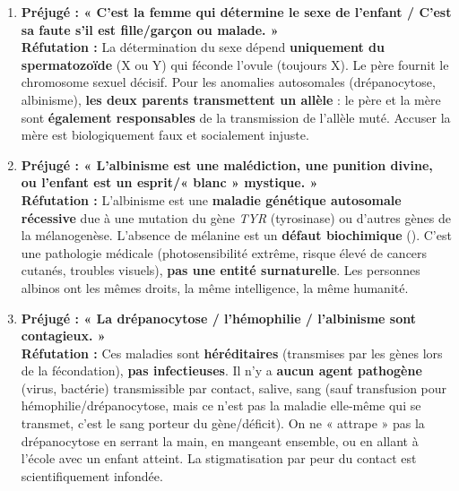 \documentclass[11pt]{article}
\begin{document}
\begin{propriete}
\begin{enumerate}
    \item \textbf{Préjugé : « C'est la femme qui détermine le sexe de l'enfant / C'est sa faute s'il est fille/garçon ou malade. »} \\
    \textbf{Réfutation :} La détermination du sexe dépend \textbf{uniquement du spermatozoïde} (X ou Y) qui féconde l'ovule (toujours X). Le père fournit le chromosome sexuel décisif. Pour les anomalies autosomales (drépanocytose, albinisme), \textbf{les deux parents transmettent un allèle} : le père et la mère sont \textbf{également responsables} de la transmission de l'allèle muté. Accuser la mère est biologiquement faux et socialement injuste.
    \item \textbf{Préjugé : « L'albinisme est une malédiction, une punition divine, ou l'enfant est un esprit/« blanc » mystique. »} \\
    \textbf{Réfutation :} L'albinisme est une \textbf{maladie génétique autosomale récessive} due à une mutation du gène \emph{TYR} (tyrosinase) ou d'autres gènes de la mélanogenèse. L'absence de mélanine est un \textbf{défaut biochimique} (). C'est une pathologie médicale (photosensibilité extrême, risque élevé de cancers cutanés, troubles visuels), \textbf{pas une entité surnaturelle}. Les personnes albinos ont les mêmes droits, la même intelligence, la même humanité.
    \item \textbf{Préjugé : « La drépanocytose / l'hémophilie / l'albinisme sont contagieux. »} \\
    \textbf{Réfutation :} Ces maladies sont \textbf{héréditaires} (transmises par les gènes lors de la fécondation), \textbf{pas infectieuses}. Il n'y a \textbf{aucun agent pathogène} (virus, bactérie) transmissible par contact, salive, sang (sauf transfusion pour hémophilie/drépanocytose, mais ce n'est pas la maladie elle-même qui se transmet, c'est le sang porteur du gène/déficit). On ne « attrape » pas la drépanocytose en serrant la main, en mangeant ensemble, ou en allant à l'école avec un enfant atteint. La stigmatisation par peur du contact est scientifiquement infondée.
\end{enumerate}
\end{propriete}
\end{document}
